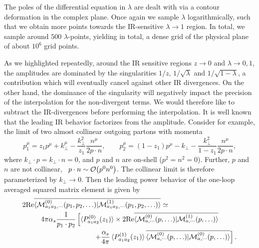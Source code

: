 The poles of the differential equation in $\lambda$ are dealt with via a contour deformation in the complex plane. Once again we sample $\lambda$ logarithmically, such that we obtain more points towards the \acs{IR}-sensitive $\lambda \rightarrow 1$ region. In total, we sample around $500$ $\lambda$-points, yielding in total, a dense grid of the physical plane of about $10^6$ grid points.

As we highlighted repeatedly, around the \acs{IR} sensitive regions $z \rightarrow 0$ and $\lambda \rightarrow 0, 1$, the amplitudes are dominated by the singularities $1/z$, $1/\sqrt{\lambda}$ and $1/\sqrt{1 - \lambda}$, a contribution which will eventually cancel against other \acs{IR} divergences. On the other hand, the dominance of the singularity will negatively impact the precision of the interpolation for the non-divergent terms. We would therefore like to subtract the \acs{IR}-divergences before performing the interpolation. It is well known that the leading \acs{IR} behavior factorizes from the amplitude. Consider for example, the limit of two almost collinear outgoing partons with momenta
\begin{equation}
p_1^\mu = z_1 p^\mu + k_\perp^\mu - \frac{k_\perp^2}{z_1} \frac{n^\mu}{2 p \cdot n}, \qquad p_2^\mu = (1 - z_1) p^\mu - k_\perp - \frac{k_\perp^2}{1 - z_1} \frac{n^\mu}{2 p \cdot n},
\end{equation}
where $k_\perp \cdot p = k_\perp \cdot n = 0$, and $p$ and $n$ are on-shell ($p^2 = n^2 = 0$). Further, $p$ and $n$ are not collinear, \ie\ $p \cdot n \sim \mathcal{O}\!\left(p^0 n^0\right)$. The collinear limit is therefore parameterized by $k_\perp \rightarrow 0$. Then the leading power behavior of the one-loop averaged squared matrix element is given by
\begin{equation}
\begin{split}
2 \text{Re} &\overline{\braket{\mathcal{M}_{a_1 a_2,\cdots}^{(0)} (p_1, p_2, \ldots)| \mathcal{M}_{a_1 a_2,\cdots}^{(1)} (p_1, p_2, \ldots)}} \simeq \\
& \quad 4 \pi \alphas \frac{1}{p_1 \cdot p_2} \left[ \braket{P^{(0)}_{a_1 a_2}(z_1)} \times 2 \text{Re} \overline{\braket{\mathcal{M}_{a,\cdots}^{(0)} (p, \ldots)| \mathcal{M}_{a,\cdots}^{(1)} (p, \ldots)}} \right. \\
&\hspace{3cm} \left. + \frac{\alphas}{4 \pi} \braket{P^{(1)}_{a_1 a_2}(z_1)} \overline{\braket{\mathcal{M}_{a,\cdots}^{(0)} (p, \ldots)| \mathcal{M}_{a,\cdots}^{(0)} (p, \ldots)}} \right].
\end{split}
\label{eq:5:collinear_limit}
\end{equation}
